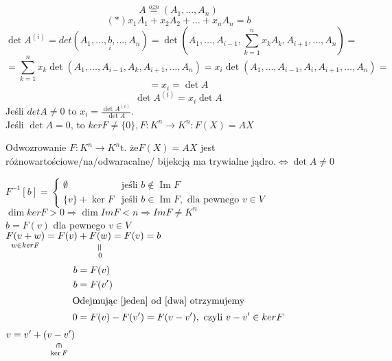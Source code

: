 \begin{dd} 
    $$ A  \overset{ozn}{=} (A_1,\dots,A_n) $$ 
    $$(\ast) x_1A_1 + x_2A_2 + \dots + x_nA_n = b$$
    $$ \det A^(i) = det(A_1,\dots,\underset{i}{b},\dots,A_n) = \det(A_1,\dots,A_{i-1},\sum_{k=1}^n x_kA_k,A_{i+1},\dots,A_n) = $$
    $$ = \sum_{k=1}^n x_k \det(A_1,\dots,A_{i-1},A_k,A_{i+1},\dots,A_n) = x_i \det (A_1,\dots, A_{i-1},A_i,A_{i+1},\dots,A_n) = $$
    $$ = x_i = \det A$$
    $$ \det A^{(i)} = x_i \det A$$
Jeśli $det A \neq 0$ to $x_i = \frac{\det A^{(i)}}{\det A}$. \\
Jeśli $\det A = 0$, to $ker F \neq \{0\}, F: K^n \rightarrow K^n : F(X) = AX$

\begin{lem}
    Odwozrowanie $F: K^n \rightarrow K^n \text{t. że} F(X) = AX $ jest różnowartościowe/na/odwaracalne/ bijekcją ma trywialne jądro.$\Leftrightarrow \det A \neq 0$
\end{lem}
$ F^{-1} [b] = 
    \begin{cases} 
        \emptyset & \text{jeśli } b \notin \operatorname{Im} F\\ 
        \{v\} + \ker F & \text{jeśli } b \in \operatorname{Im} F,\text{ dla pewnego } v \in V
    \end{cases}$ \\
$ \dim ker F > 0 \Rightarrow \dim ImF < n \Rightarrow ImF \neq K^n $ \\
$b = F(v)$ dla pewnego $v \in V$ \\ 
$ \underset{w \in ker F}{F(v+w)} = F(v) + \underscript{F(w)}{\verteq}{0} = F(v) = b$ 
\begin{align}
    b &= F(v) \label{jeden}\\
    b &= F(v') \label{dwa} \\
    \shortintertext{Odejmując \eqref{jeden} od \eqref{dwa} otrzymujemy}
    0 &= F(v) - F(v') = F(v-v'), \text{ czyli } v-v' \in ker F \notag
\end{align}
    $v = v' + \underscript{(v - v')}{\vertin}{\ker F}$
\end{dd}

